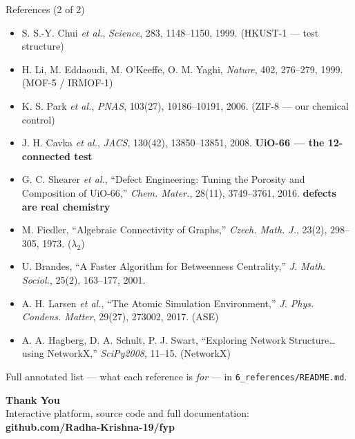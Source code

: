 \documentclass[aspectratio=169, 11pt]{beamer}
\begin{document}
\begin{frame}{References (2 of 2)}
{\tiny
\begin{itemize}\itemsep2pt
\item[{[11]}] S. S.-Y. Chui \textit{et al.}, \textit{Science}, 283, 1148--1150, 1999.
      \hfill (HKUST-1 --- test structure)
\item[{[12]}] H. Li, M. Eddaoudi, M. O'Keeffe, O. M. Yaghi, \textit{Nature}, 402, 276--279, 1999.
      \hfill (MOF-5 / IRMOF-1)
\item[{[13]}] K. S. Park \textit{et al.}, \textit{PNAS}, 103(27), 10186--10191, 2006.
      \hfill (ZIF-8 --- our chemical control)
\item[{[14]}] J. H. Cavka \textit{et al.}, \textit{JACS}, 130(42), 13850--13851, 2008.
      \hfill \textcolor{coolBlue}{\textbf{UiO-66 --- the 12-connected test}}
\item[{[15]}] G. C. Shearer \textit{et al.}, ``Defect Engineering: Tuning the Porosity and
      Composition of UiO-66,'' \textit{Chem. Mater.}, 28(11), 3749--3761, 2016.
      \hfill \textcolor{coolBlue}{\textbf{defects are real chemistry}}
\item[{[16]}] M. Fiedler, ``Algebraic Connectivity of Graphs,'' \textit{Czech. Math. J.},
      23(2), 298--305, 1973. \hfill ($\lambda_2$)
\item[{[17]}] U. Brandes, ``A Faster Algorithm for Betweenness Centrality,''
      \textit{J. Math. Sociol.}, 25(2), 163--177, 2001.
\item[{[18]}] A. H. Larsen \textit{et al.}, ``The Atomic Simulation Environment,''
      \textit{J. Phys. Condens. Matter}, 29(27), 273002, 2017. \hfill (ASE)
\item[{[19]}] A. A. Hagberg, D. A. Schult, P. J. Swart, ``Exploring Network Structure\ldots
      using NetworkX,'' \textit{SciPy2008}, 11--15. \hfill (NetworkX)
\end{itemize}}
\vspace{0.15cm}
{\scriptsize Full annotated list --- what each reference is \textit{for} --- in
\texttt{6\_references/README.md}.}
\end{frame}

\begin{frame}
\centering
{\Huge \textbf{\textcolor{amritaMaroon}{Thank You}}}\\[0.6cm]
{\footnotesize Interactive platform, source code and full documentation:}\\
{\small \textbf{github.com/Radha-Krishna-19/fyp}}
\end{frame}
\end{document}
